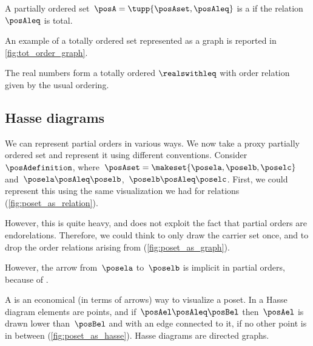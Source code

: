 \begin{ctdefinition}
    \label{def:total-order}
    A partially ordered set~$\posA = \tupp{\posAset,\posAleq}$ is a  if the relation~$\posAleq$ is total.
\end{ctdefinition}

An example of a totally ordered set represented as a graph is reported in \cref{fig:tot_order_graph}.


\begin{example}[Reals]
    The real numbers \reals form a totally ordered  $\realswithleq$ with order relation given by the usual ordering.
\end{example}
\vfill
\clearpage

\subsection{Hasse diagrams}
We can represent partial orders in various ways.
We now take a proxy partially ordered set and represent it using different conventions.
Consider~$\posAdefinition$, where~$\posAset=\makeset{\posela,\poselb,\poselc}$ and~$\posela\posAleq \poselb$,~$\poselb\posAleq \poselc$.
First, we could represent this using the same visualization we had for relations (\cref{fig:poset_as_relation}).

However, this is quite heavy, and does not exploit the fact that partial orders are endorelations.
Therefore, we could think to only draw the carrier set once, and to drop the order relations arising from  (\cref{fig:poset_as_graph}).

However, the arrow from~$\posela$ to~$\poselb$ is implicit in partial orders, because of .

\label{sec:hasse-diagram}
A  is an economical (in terms of arrows) way to visualize a poset.
In a Hasse diagram elements are points, and if~$\posAel \posAleq \posBel$ then~$\posAel$ is drawn lower than~$\posBel$ and with an edge connected to it, if no other point is in between (\cref{fig:poset_as_hasse}).
Hasse diagrams are directed graphs.

